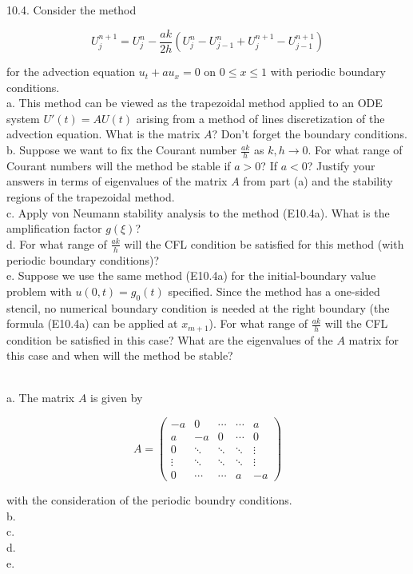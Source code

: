 10.4. Consider the method

$$U^{n+1}_j=U^n_j-\frac{ak}{2h}(U^n_j-U^n_{j-1}+U^{n+1}_j -U^{n+1}_{j-1})$$

for the advection equation $u_t+au_x = 0$ on $0\leq x\leq1$ with periodic boundary conditions.\\
a. This method can be viewed as the trapezoidal method applied to an ODE system $U'(t) = AU(t)$
arising from a method of lines discretization of the advection equation. What is the matrix $A$? Don't
forget the boundary conditions.\\
b. Suppose we want to fix the Courant number $\frac{ak}{h}$ as $k,h\rightarrow0$. For what range of
Courant numbers will the method be stable if $a>0$? If $a<0$? Justify your answers in terms of
eigenvalues of the matrix $A$ from part (a) and the stability regions of the trapezoidal method.\\
c. Apply von Neumann stability analysis to the method (E10.4a). What is the amplification factor
$g(\xi)$?\\
d. For what range of $\frac{ak}{h}$ will the CFL condition be satisfied for this method (with periodic
boundary conditions)?\\
e. Suppose we use the same method (E10.4a) for the initial-boundary value problem with $u(0, t)=g_0(t)$
specified. Since the method has a one-sided stencil, no numerical boundary condition is needed at the
right boundary (the formula (E10.4a) can be applied at $x_{m+1}$). For what range of $\frac{ak}{h}$ will
the CFL condition be satisfied in this case? What are the eigenvalues of the $A$ matrix for this case
and when will the method be stable?\\

\begin{solution}\renewcommand{\qedsymbol}{}\ \\
    a. The matrix $A$ is given by

    $$A=\left(\begin{array}{ccccc} -a & 0 & \cdots & \cdots & a \\ a & -a & 0 & \cdots & 0
                                \\ 0 & \ddots & \ddots & \ddots & \vdots
                                \\ \vdots & \ddots & \ddots & \ddots & \vdots
                                \\ 0 & \cdots & \cdots & a & -a \end{array}\right)$$

    with the consideration of the periodic boundry conditions.\\

    b. \\

    c. \\

    d. \\

    e.

\end{solution}